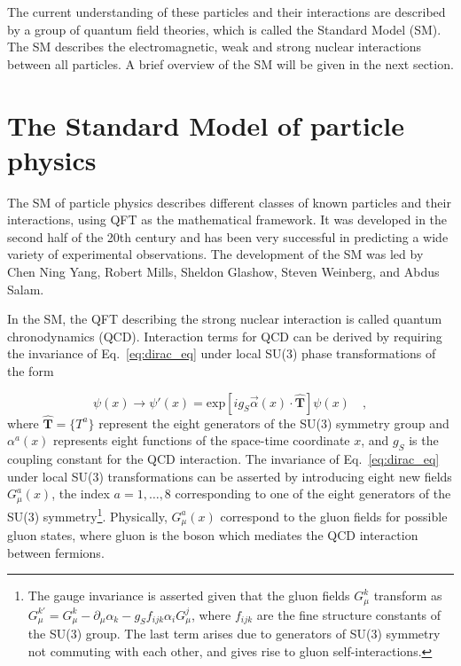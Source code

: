 The current understanding of these particles and their interactions are described by a group of quantum
field theories, which is called the Standard Model (SM). The SM describes the electromagnetic, weak and 
strong nuclear interactions between all particles. A brief overview of the SM will be given in the
next section.

\section{The Standard Model of particle physics}

The SM of particle physics describes different classes of known particles and their interactions, 
using QFT as the mathematical framework. It was developed in the second half of the 20th century
and has been very successful in predicting a wide variety of experimental observations. The development of the SM
was led by Chen Ning Yang, Robert Mills, Sheldon Glashow, Steven Weinberg, and Abdus Salam.

In the SM, the QFT describing the strong nuclear interaction is called quantum chronodynamics (QCD). 
Interaction terms for QCD can be derived by requiring the invariance of Eq.~\ref{eq:dirac_eq} under 
local SU(3) phase transformations of the form

\begin{equation}
    \psi(x) \rightarrow \psi'(x) = \text{exp} \left[ i g_S \vec{\alpha}(x) \cdot \hat{\mathbf{T}}  \right]  \psi(x) \quad ,
\end{equation}
where $\hat{\mathbf{T}} = \{ T^a \}$ represent the eight generators of the SU(3) symmetry group and $\alpha^a(x)$ 
represents eight functions
of the space-time coordinate $x$, and $g_{S}$ is the coupling constant for the QCD interaction.
The invariance of Eq.~\ref{eq:dirac_eq} under local SU(3) transformations can be asserted by introducing eight new fields
$G_{\mu}^{a}(x)$, the index $a = 1, \dots, 8$ corresponding to one of the eight generators of the SU(3) 
symmetry\footnote{The gauge invariance is asserted given that the gluon fields $G_{\mu}^{k}$ transform as
$G_{\mu}^{k'} = G_{\mu}^{k} - \partial_{\mu}\alpha_{k} - g_{S}f_{ijk}\alpha_{i}G_{\mu}^{j}$, where $f_{ijk}$ are
the fine structure constants of the SU(3) group. The last term arises due to generators of SU(3) symmetry not commuting
with each other, and gives rise to gluon self-interactions.}. Physically,
$G_{\mu}^{a}(x)$ correspond to the gluon fields for possible gluon states, where gluon is the boson which
mediates the QCD interaction between 
fermions.

